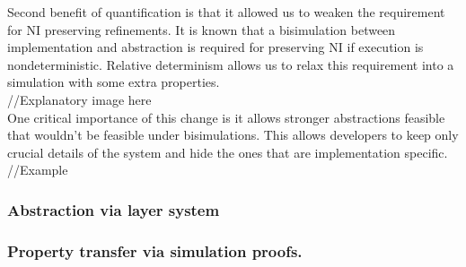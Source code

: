 \documentclass[onecolumn]{paper}
\begin{document}
Second benefit of quantification is that it allowed us to weaken the requirement for NI preserving refinements. It is known that a bisimulation between implementation and abstraction is required for preserving NI if execution is nondeterministic. Relative determinism allows us to relax this requirement into a simulation with some extra properties. \\

//Explanatory image here\\

One critical importance of this change is it allows stronger abstractions feasible that wouldn't be feasible under bisimulations. This allows developers to keep only crucial details of the system and hide the ones that are implementation specific.\\

//Example\\

\subsubsection*{Abstraction via layer system}


\subsubsection*{Property transfer via simulation proofs.}
\end{document}
